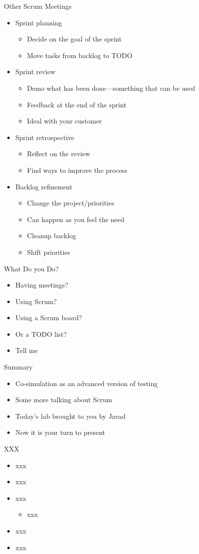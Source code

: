 \begin{frame}[fragile]{Other Scrum Meetings}
\begin{itemize}
\item Sprint planning
\begin{itemize}
\item Decide on the goal of the sprint
\item Move tasks from backlog to TODO
\end{itemize}
\item Sprint review
\begin{itemize}
\item Demo what has been done---something that can be used
\item Feedback at the end of the sprint
\item Ideal with your customer
\end{itemize}
\item Sprint retrospective
\begin{itemize}
\item Reflect on the review
\item Find ways to improve the process
\end{itemize}
\item Backlog refinement
\begin{itemize}
\item Change the project/priorities
\item Can happen as you feel the need
\item Cleanup backlog
\item Shift priorities
\end{itemize}
\end{itemize}
\end{frame}

\begin{frame}[fragile]{What Do you Do?}
\begin{itemize}
\item Having meetings?
\item Using Scrum?
\item Using a Scrum board?
\item Or a TODO list?
\item Tell me
\end{itemize}
\end{frame}


\begin{frame}[fragile]{Summary}
\begin{itemize}
\item Co-simulation as an advanced version of testing
\item Some more talking about Scrum
\item Today's lab brought to you by Javad
\item Now it is your turn to present
\end{itemize}
\end{frame}




\begin{frame}[fragile]{XXX}
\begin{itemize}
\item xxx
\item xxx
\item xxx
\begin{itemize}
\item xxx
\end{itemize}
\item xxx
\item xxx
\end{itemize}
\end{frame}
